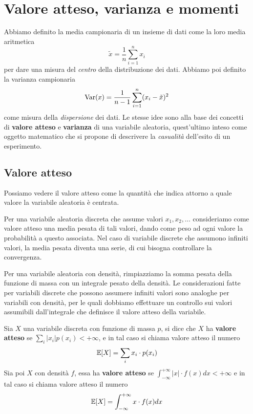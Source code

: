 \section{Valore atteso, varianza e momenti}
Abbiamo definito la media campionaria di un insieme di dati come la loro media aritmetica
\[ \tilde{x} = \frac{1}{n} \sum_{i=1}^n x_i \]
per dare una misura del \emph{centro} della distribuzione dei dati. Abbiamo poi definito la
varianza campionaria
\[ \operatorname{Var}(x) = \frac{1}{n-1} \sum_{i=1}^n (x_i - \tilde{x})^2 \]
come misura della \emph{dispersione} dei dati. Le stesse idee sono alla base dei concetti di
\textbf{valore atteso} e \textbf{varianza} di una variabile aleatoria, quest'ultimo inteso come
oggetto matematico che si propone di descrivere la \emph{casualità} dell'esito di un esperimento.

\subsection{Valore atteso}
Possiamo vedere il valore atteso come la quantità che indica attorno a quale valore la variabile
aleatoria è centrata.

Per una variabile aleatoria discreta che assume valori $x_1, x_2, \dots$ consideriamo come valore
atteso una media pesata di tali valori, dando come peso ad ogni valore la probabilità a questo
associata. Nel caso di variabile discrete che assumono infiniti valori, la media pesata diventa
una serie, di cui bisogna controllare la convergenza.

Per una variabile aleatoria con densità, rimpiazziamo la somma pesata della funzione di massa con
un integrale pesato della densità. Le considerazioni fatte per variabili discrete che possono
assumere infiniti valori sono analoghe per variabili con densità, per le quali dobbiamo effettuare
un controllo sui valori assumibili dall'integrale che definisce il valore atteso della variabile.

\begin{definition}
	Sia $X$ una variabile discreta con funzione di massa $p$, si dice che $X$ ha
	\textbf{valore atteso} se $\sum_i |x_i| p(x_i) < +\infty$, e in tal caso si chiama valore
	atteso il numero
	\[ \mathbb{E}[X] = \sum_i x_i \cdot p(x_i) \]
	Sia poi $X$ con densità $f$, essa ha \textbf{valore atteso} se
	$\int_{-\infty}^{+\infty} |x| \cdot f(x) dx < +\infty$ e in tal caso si chiama valore atteso
	il numero
	\[ \mathbb{E}[X] = \int_{-\infty}^{+\infty} x \cdot f(x) dx \]
\end{definition}

